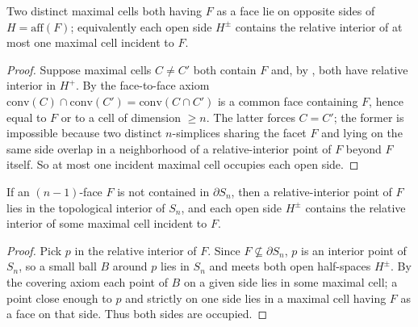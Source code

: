 \begin{lemma}
    \label{lem:one-cell-per-side}
    Two distinct maximal cells both having $F$ as a face lie on opposite sides of
    $H = \mathrm{aff}(F)$; equivalently each open side $H^\pm$ contains the
    relative interior of at most one maximal cell incident to $F$.
\end{lemma}
\begin{proof}
    Suppose maximal cells $C \ne C'$ both contain $F$ and, by
    , both have relative interior in $H^+$. By the
    face-to-face axiom $\mathrm{conv}(C) \cap \mathrm{conv}(C') =
    \mathrm{conv}(C \cap C')$ is a common face containing $F$, hence equal to $F$
    or to a cell of dimension $\ge n$. The latter forces $C = C'$; the former is
    impossible because two distinct $n$-simplices sharing the facet $F$ and lying
    on the same side overlap in a neighborhood of a relative-interior point of
    $F$ beyond $F$ itself. So at most one incident maximal cell occupies each
    open side.
\end{proof}

\begin{lemma}
    \label{lem:interior-facet-both-sides}
    If an $(n-1)$-face $F$ is not contained in $\partial S_n$, then a
    relative-interior point of $F$ lies in the topological interior of $S_n$, and
    each open side $H^\pm$ contains the relative interior of some maximal cell
    incident to $F$.
\end{lemma}
\begin{proof}
    Pick $p$ in the relative interior of $F$. Since $F \not\subseteq \partial
    S_n$, $p$ is an interior point of $S_n$, so a small ball $B$ around $p$ lies
    in $S_n$ and meets both open half-spaces $H^\pm$. By the covering axiom each
    point of $B$ on a given side lies in some maximal cell; a point close enough
    to $p$ and strictly on one side lies in a maximal cell having $F$ as a face on
    that side. Thus both sides are occupied.
\end{proof}

